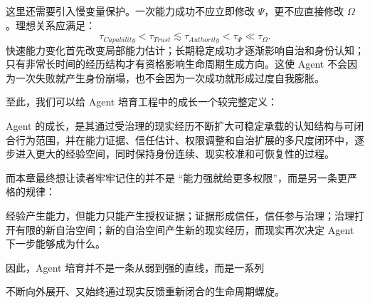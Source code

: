 这里还需要引入慢变量保护。一次能力成功不应立即修改 $\Psi$，更不应直接修改 $\Omega$。理想关系应满足：
\[
\tau_{Capability}
<
\tau_{Trust}
\lesssim
\tau_{Authority}
<
\tau_{\Psi}
\ll
\tau_{\Omega}.
\]
快速能力变化首先改变局部能力估计；长期稳定成功才逐渐影响自治和身份认知；只有非常长时间的经历结构才有资格影响生命周期生成方向。这使 Agent 不会因为一次失败就产生身份崩塌，也不会因为一次成功就形成过度自我膨胀。

至此，我们可以给 Agent 培育工程中的成长一个较完整定义：
\begin{definition*}
Agent 的成长，是其通过受治理的现实经历不断扩大可稳定承载的认知结构与可闭合行为范围，并在能力证据、信任估计、权限调整和自治扩展的多尺度闭环中，逐步进入更大的经验空间，同时保持身份连续、现实校准和可恢复性的过程。
\end{definition*}

而本章最终想让读者牢牢记住的并不是 ``能力强就给更多权限''，而是另一条更严格的规律：
\begin{proposition*}
经验产生能力，但能力只能产生授权证据；证据形成信任，信任参与治理；治理打开有限的新自治空间；新的自治空间产生新的现实经历，而现实再次决定 Agent 下一步能够成为什么。
\end{proposition*}

因此，Agent 培育并不是一条从弱到强的直线，而是一系列
\begin{statementbox}
\centering
{}
\end{statementbox}
不断向外展开、又始终通过现实反馈重新闭合的生命周期螺旋。
